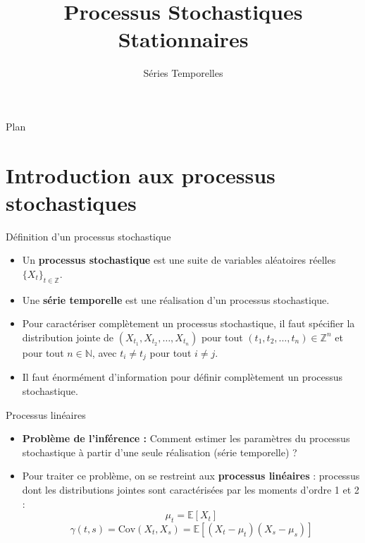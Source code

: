 \documentclass[11pt,aspectratio=169]{beamer}
\title{Processus Stochastiques Stationnaires}
\subtitle{Séries Temporelles}
\author{}
\date{}
\institute{}
\newcommand{\E}{\mathbb{E}}
\newcommand{\Cov}{\mathrm{Cov}}
\newcommand{\Z}{\mathbb{Z}}
\newcommand{\N}{\mathbb{N}}
\begin{document}
\begin{frame}
\titlepage
\end{frame}

\begin{frame}{Plan}
\tableofcontents
\end{frame}

\section{Introduction aux processus stochastiques}

\begin{frame}{Définition d'un processus stochastique}

\begin{itemize}

\item Un \textbf{processus stochastique} est une suite de variables aléatoires réelles $\{X_t\}_{t \in \Z}$.\newline

\item Une \textbf{série temporelle} est une réalisation d'un processus stochastique.\newline

\item Pour caractériser complètement un processus stochastique, il faut spécifier la distribution jointe de $(X_{t_1}, X_{t_2}, \ldots, X_{t_n})$ pour tout $(t_1, t_2, \ldots, t_n) \in \Z^n$ et pour tout $n \in \N$, avec $t_i \neq t_j$ pour tout $i \neq j$.\newline

\item Il faut énormément d'information pour définir complètement un processus stochastique.

\end{itemize}

\end{frame}

\begin{frame}{Processus linéaires}

\begin{itemize}

\item \textbf{Problème de l'inférence :} Comment estimer les paramètres du processus stochastique à partir d'une seule réalisation (série temporelle) ?\newline

\item Pour traiter ce problème, on se restreint aux \textbf{processus linéaires} : processus dont les distributions jointes sont caractérisées par les moments d'ordre 1 et 2 :
  \[
  \mu_t = \E[X_t]
  \]
  \[
  \gamma(t,s) = \Cov(X_t, X_s) = \E\left[(X_t - \mu_t)(X_s - \mu_s)\right]
  \]

\end{itemize}

\end{frame}
\end{document}
